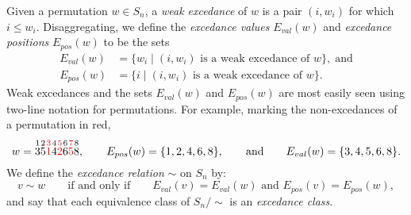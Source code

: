 \documentclass[submission]{FPSAC2024}
\theoremstyle{definition}
\theoremstyle{remark}
\numberwithin{equation}{section}
\newcommand{\EP}{E_{pos}}
\newcommand{\EV}{E_{val}}
\begin{document}
Given a permutation $w \in S_{n}$, a \emph{weak excedance} of $w$ is a pair $(i, w_{i})$ for which $i \le w_{i}$.  Disaggregating, we define the \emph{excedance values} $\EV(w)$ and \emph{excedance positions} $\EP(w)$ to be the sets
\begin{align*}
\EV(w) &= \{ w_{i} \;|\; \text{$(i, w_{i})$ is a weak excedance of $w$}\},\;\text{and} \\[0.5em]
\EP(w) &= \{ i  \;|\; \text{$(i, w_{i})$ is a weak excedance of $w$}\}.
\end{align*}
Weak excedances and the sets $\EV(w)$ and $\EP(w)$ are most easily seen using two-line notation for permutations.  For example, marking the non-excedances of a permutation in red,
\[
w = \overset{1}{3} \overset{2}{5} {\color{red} \overset{3}{1}} \overset{4}{4} {\color{red} \overset{5}{2}} \overset{6}{6} {\color{red} \overset{7}{5}} \overset{8}{8},
\qquad
\EP(w) = \{1, 2, 4, 6, 8\},\qquad\text{and}\qquad
\EV(w) = \{3, 4, 5, 6, 8\}.
\]
We define the \emph{excedance relation} $\sim$ on $S_{n}$ by:
\begin{equation}
\label{eq:excednacerel}
v \sim w \qquad\text{if and only if} \qquad \text{$\EV(v) = \EV(w)$ and $\EP(v) = \EP(w)$},
\end{equation}
and say that each equivalence class of $S_{n}\big/\!\!\sim$ is an \emph{excedance class}.
\end{document}
